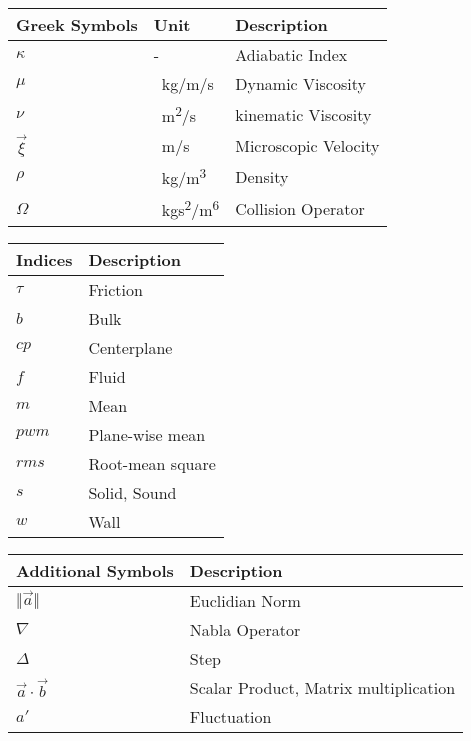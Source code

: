\begin{tabular}{p{5cm}p{4cm}p{5cm}}
Greek Symbols     & Unit           & Description             \\ \hline
	$\kappa$			& -					& Adiabatic Index \\
    $\mu$               & \SI{}{kg/m/s}     & Dynamic Viscosity\\
    $\nu$               & \SI{}{m^2/s}      & kinematic Viscosity  \\
    $\vec{\xi}$         & \SI{}{m/s}        & Microscopic Velocity \\
    $\rho$              & \SI{}{kg/m^3}     & Density \\
    $\Omega$            & \SI{}{kgs^2/m^6}  & Collision Operator \\

\end{tabular}

\vspace{0.5cm}

\begin{tabular}{p{7cm}p{7cm}}
	Indices & Description  \\ \hline
    $\tau$  & Friction \\
    $b$     & Bulk \\
    $cp$    & Centerplane \\
    $f$     & Fluid \\
    $m$     & Mean \\
    $pwm$   & Plane-wise mean \\
    $rms$   & Root-mean square \\
    $s$     & Solid, Sound \\
    $w$     & Wall \\

\end{tabular}

\vspace{0.5cm}

\begin{tabular}{p{7cm}p{7cm}}
	Additional Symbols          & Description    \\ \hline
	$\Vert \vec{a} \Vert $      & Euclidian Norm \\
	$\nabla$                    & Nabla Operator \\
	$\Delta$                    & Step\\
	$\vec{a} \cdot \vec{b} $    & Scalar Product, Matrix multiplication \\
	$a'$						& Fluctuation \\


	
	
\end{tabular}

